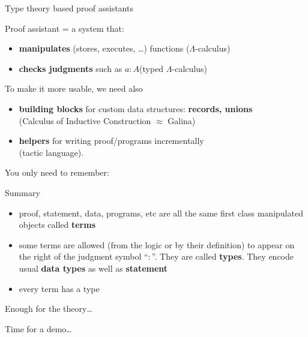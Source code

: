 \documentclass[compress,11pt]{beamer}
\begin{document}
\begin{frame}{Type theory based proof assistants}

  Proof assistant = a system that:
    \pause\medskip

  \begin{itemize}
  \item \textbf{manipulates} (stores, executes, \dots) functions
    \hfill ($\Lambda$-calculus)
    \medskip

  \item \textbf{checks judgments} such as $a : A$\hfill(typed $\Lambda$-calculus)
  \end{itemize}
  \pause\medskip

  To make it more usable, we need also
  \begin{itemize}
  \item \textbf{building blocks} for custom data structures: \textbf{records,
      unions} \\
    \hfill (Calculus of Inductive Construction $\approx$ Galina)

  \item \textbf{helpers} for writing proof/programs incrementally \\
    \hfill (tactic language).
  \end{itemize}
\end{frame}

\begin{frame}

  You only need to remember:
  \begin{block}{Summary}
    \begin{itemize}
    \item proof, statement, data, programs, etc are all the same first class
      manipulated objects called \textbf{terms}
    \item some terms are allowed (from the logic or by their definition) to
      appear on the right of the judgment symbol ``$:$''. They are called
      \textbf{types}. They encode usual \textbf{data types} as well as
      \textbf{statement}
    \item every term has a type
    \end{itemize}

  \end{block}
  \pause

  \Huge\bf

  Enough for the theory\dots
  \bigskip

  \hspace{2cm}Time for a demo\dots
\end{frame}
\end{document}
